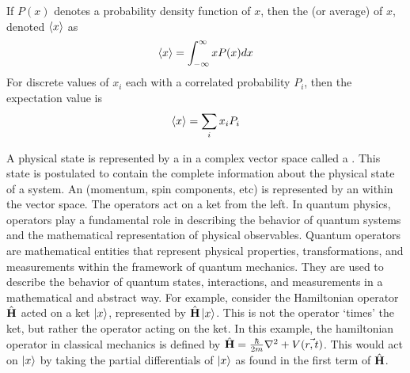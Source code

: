 \begin{defn}{1}
	If $P(x)$ denotes a probability density function of $x$, then the  (or average) of $x$, denoted $\braket{x}$ as
	\begin{align}
		\braket{x} = \int_{-\infty}^{\infty}xP(x) dx \label{expectation Value equation}
	\end{align}
	For discrete values of $x_i$ each with a correlated probability $P_i$, then the expectation value is 
	\begin{align}
		\braket{x} = \sum_{i}x_iP_i \label{expectation Value equation discrete}
	\end{align}
\end{defn}
 
A physical state is represented by a  in a complex vector space called a . This state is postulated to contain the complete information about the physical state of a system. An  (momentum, spin components, etc) is represented by an  within the vector space. The operators act on a ket from the left. In quantum physics, operators play a fundamental role in describing the behavior of quantum systems and the mathematical representation of physical observables. Quantum operators are mathematical entities that represent physical properties, transformations, and measurements within the framework of quantum mechanics. They are used to describe the behavior of quantum states, interactions, and measurements in a mathematical and abstract way. For example, consider the Hamiltonian operator $\hat{\text{\textbf{H}}}$ acted on a ket $\ket{x}$, represented by $\hat{\text{\textbf{H}}}\ket{x}$. This is not the operator `times' the ket, but rather the operator acting on the ket. In this example, the hamiltonian operator in classical mechanics is defined by $\hat{\text{\textbf{H}}} = \frac{\hbar}{2m}\nabla^2+V(\vec{r,t})$. This would act on $\ket{x}$ by taking the partial differentials of $\ket{x}$ as found in the first term of $\hat{\text{\textbf{H}}}$.












